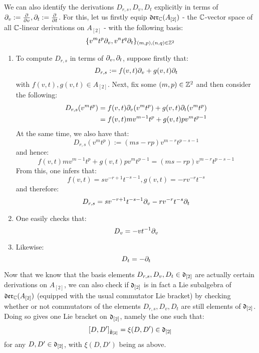 \begin{remark}
            We can also identify the derivations $D_{r, s}, D_v, D_t$ explicitly in terms of $\partial_v := \frac{\partial}{\partial v}, \partial_t := \frac{\partial}{\partial t}$. For this, let us firstly equip $\mathfrak{der}_{\mathbb{C}}(A_{[2]})$ - the $\mathbb{C}$-vector space of all $\mathbb{C}$-linear derivations on $A_{[2]}$ - with the following basis:
                $$\{ v^m t^p \partial_v, v^n t^q \partial_t \}_{(m, p), (n, q) \in \mathbb{Z}^2}$$
            \begin{enumerate}
                \item To compute $D_{r, s}$ in terms of $\partial_v, \partial_t$, suppose firstly that:
                    $$D_{r, s} := f(v, t) \partial_v + g(v, t) \partial_t$$
                with $f(v, t), g(v, t) \in A_{[2]}$. Next, fix some $(m, p) \in \mathbb{Z}^2$ and then consider the following:
                    $$
                        \begin{aligned}
                            D_{r, s}( v^m t^p ) & = f(v, t) \partial_v( v^m t^p ) + g(v, t) \partial_t( v^m t^p )
                            \\
                            & = f(v, t) m v^{m - 1} t^p + g(v, t) p v^m t^{p - 1}
                        \end{aligned}
                    $$
                At the same time, we also have that:
                    $$D_{r, s}(v^m t^p) := ( ms - rp ) v^{m - r} t^{p - s - 1}$$
                and hence:
                    $$f(v, t) m v^{m - 1} t^p + g(v, t) p v^m t^{p - 1} = ( ms - rp ) v^{m - r} t^{p - s - 1}$$
                From this, one infers that:
                    $$f(v, t) = s v^{-r + 1} t^{-s - 1}, g(v, t) = -r v^{-r} t^{-s}$$
                and therefore:
                    $$D_{r, s} = s v^{-r + 1} t^{-s - 1} \partial_v - r v^{-r} t^{-s} \partial_t$$
                \item One easily checks that:
                    $$D_v = -v t^{-1} \partial_v$$
                \item Likewise:
                    $$D_t = -\partial_t$$
            \end{enumerate}

            Now that we know that the basis elements $D_{r, s}, D_v, D_t \in \mathfrak{d}_{[2]}$ are actually certain derivations on $A_{[2]}$, we can also check if $\mathfrak{d}_{[2]}$ is in fact a Lie subalgebra of $\mathfrak{der}_{\mathbb{C}}(A_{[2]})$ (equipped with the usual commutator Lie bracket) by checking whether or not commutators of the elements $D_{r, s}, D_v, D_t$ are still elements of $\mathfrak{d}_{[2]}$. Doing so gives one Lie bracket on $\mathfrak{d}_{[2]}$, namely the one such that:
                $$[D, D']_{\hat{\mathfrak{g}}_{[2]}} = \xi(D, D') \in \mathfrak{d}_{[2]}$$
            for any $D, D' \in \mathfrak{d}_{[2]}$, with $\xi(D, D')$ being as above.
        \end{remark}
        
